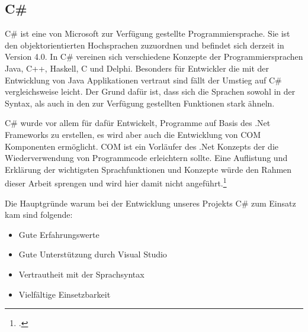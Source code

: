 \subsection{C\#}
C\# ist eine von Microsoft zur Verfügung gestellte Programmiersprache. Sie ist den objektorientierten Hochsprachen zuzuordnen und befindet sich derzeit in Version 4.0. In C\# vereinen sich verschiedene Konzepte der Programmiersprachen Java, C++, Haskell, C und Delphi. Besonders für Entwickler die mit der Entwicklung von Java Applikationen vertraut sind fällt der Umstieg auf C\# vergleichsweise leicht. Der Grund dafür ist, dass sich die Sprachen sowohl in der Syntax, als auch in den zur Verfügung gestellten Funktionen stark ähneln.

C\# wurde vor allem  für dafür Entwickelt, Programme auf Basis des .Net Frameworks zu erstellen, es wird aber auch die Entwicklung von COM Komponenten ermöglicht. COM ist ein  Vorläufer des .Net Konzepts der die Wiederverwendung von Programmcode erleichtern sollte.
Eine Auflistung und Erklärung der wichtigsten Sprachfunktionen und Konzepte würde den Rahmen dieser Arbeit sprengen und wird hier damit nicht angeführt.\footcite[vgl.][]{csharp}

Die Hauptgründe warum bei der Entwicklung unseres Projekts C\# zum Einsatz kam sind folgende:
\begin{itemize}
\item Gute Erfahrungswerte\\

\item Gute Unterstützung durch Visual Studio\\

\item Vertrautheit mit der Sprachsyntax\\

\item Vielfältige Einsetzbarkeit\\
\end{itemize}
